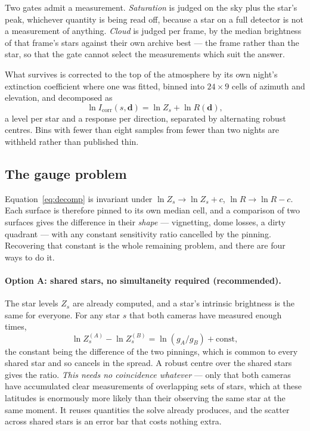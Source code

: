 \documentclass[11pt,a4paper]{article}
\newcommand{\gain}{g}
\begin{document}
Two gates admit a measurement. \emph{Saturation} is judged on the sky plus the
star's peak, whichever quantity is being read off, because a star on a full
detector is not a measurement of anything. \emph{Cloud} is judged per frame, by
the median brightness of that frame's stars against their own archive best ---
the frame rather than the star, so that the gate cannot select the measurements
which suit the answer.

What survives is corrected to the top of the atmosphere by its own night's
extinction coefficient where one was fitted, binned into $24\times 9$ cells of
azimuth and elevation, and decomposed as
\begin{equation}
  \ln I_{\text{corr}}(s,\mathbf{d}) = \ln Z_s + \ln R(\mathbf{d}),
  \label{eq:decomp}
\end{equation}
a level per star and a response per direction, separated by alternating robust
centres. Bins with fewer than eight samples from fewer than two nights are
withheld rather than published thin.

\subsection{The gauge problem}

Equation~\eqref{eq:decomp} is invariant under $\ln Z_s \to \ln Z_s + c$,
$\ln R \to \ln R - c$. Each surface is therefore pinned to its own median cell,
and a comparison of two surfaces gives the difference in their \emph{shape} ---
vignetting, dome losses, a dirty quadrant --- with any constant sensitivity
ratio cancelled by the pinning. Recovering that constant is the whole remaining
problem, and there are four ways to do it.

\paragraph{Option A: shared stars, no simultaneity required (recommended).}
The star levels $Z_s$ are already computed, and a star's intrinsic brightness is
the same for everyone. For any star $s$ that both cameras have measured enough
times,
\[
  \ln Z_s^{(A)} - \ln Z_s^{(B)} = \ln(\gain_A/\gain_B) + \text{const},
\]
the constant being the difference of the two pinnings, which is common to every
shared star and so cancels in the spread. A robust centre over the shared stars
gives the ratio. \emph{This needs no coincidence whatever} --- only that both
cameras have accumulated clear measurements of overlapping sets of stars, which
at these latitudes is enormously more likely than their observing the same star
at the same moment. It reuses quantities the solve already produces, and the
scatter across shared stars is an error bar that costs nothing extra.
\end{document}
